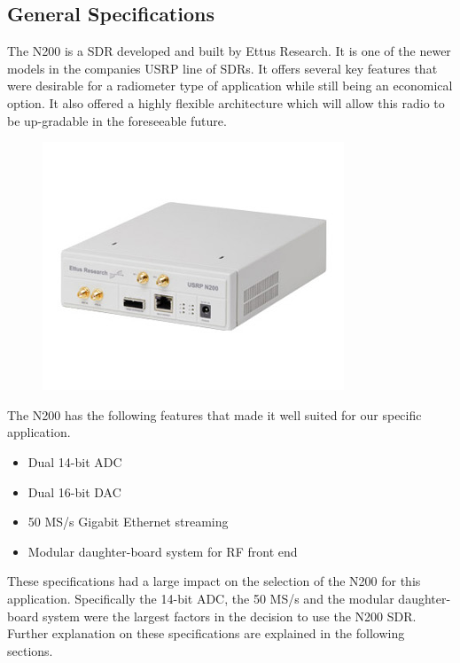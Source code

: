 \subsection{General Specifications}

The N200 is a SDR developed and built by Ettus Research.  It is one of the newer models in the companies USRP line of SDRs.  It offers several key features that were desirable for a radiometer type of application while still being an economical option.  It also offered a highly flexible architecture which will allow this radio to be up-gradable in the foreseeable future.  

{\begin{figure}[h!tb] 
\centering
\includegraphics{Images/n200}
\label{N200}
\end{figure}
}

The N200 has the following features that made it well suited for our specific application.

\begin{itemize}
\item Dual 14-bit ADC
\item Dual 16-bit DAC
\item 50 MS/s Gigabit Ethernet streaming
\item Modular daughter-board system for RF front end
\end{itemize}

These specifications had a large impact on the selection of the N200 for this application.  Specifically the 14-bit ADC, the 50 MS/s and the modular daughter-board system were the largest factors in the decision to use the N200 SDR.  Further explanation on these specifications are explained in the following sections.

